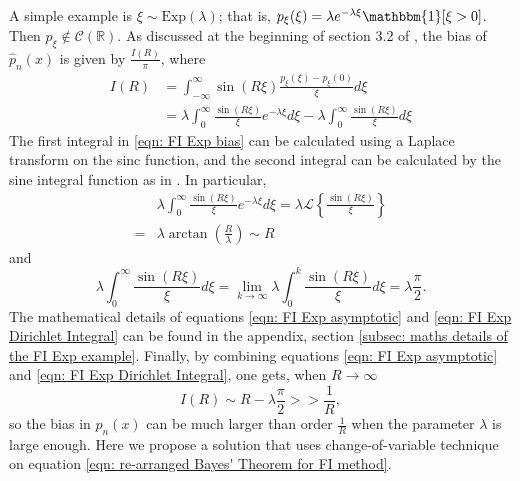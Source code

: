 \documentclass[%
 reprint,
 amsmath,amssymb,
 aps,
]{revtex4-2}
\def\R{\mathbb{R}}
\begin{document}
A simple example is $\xi \sim \text{Exp}(\lambda)$; that is, $p_\xi(\xi) = \lambda e^{-\lambda \xi} \mathbbm{1}[\xi > 0]$. Then $p_\xi \notin \mathcal{C}(\R)$. As discussed at the beginning of section 3.2 of \cite{rotiroti2022computing}, the bias of $\hat{p}_n(x)$ is given by $\displaystyle \frac{I(R)}{\pi}$, where
\begin{align} \label{eqn: FI Exp bias}
    I(R) & = \int_{-\infty}^\infty \sin(R\xi) \frac{p_\xi(\xi) - p_\xi(0)}{\xi} d\xi \\
    & = \lambda \int_0^\infty \frac{\sin(R\xi)}{\xi} e^{-\lambda \xi} d\xi - \lambda \int_0^\infty \frac{\sin(R\xi)}{\xi} d\xi
\end{align}
The first integral in \eqref{eqn: FI Exp bias} can be calculated using a Laplace transform on the sinc function, and the second integral can be calculated by the sine integral function as in \cite{rotiroti2022computing}. In particular,
\begin{align} \label{eqn: FI Exp asymptotic}
    & \lambda \int_0^\infty \frac{\sin(R\xi)}{\xi} e^{-\lambda \xi} d\xi = \lambda \mathcal{L}\left\{\frac{\sin(R\xi)}{\xi} \right\} \\
    = & \lambda \arctan\left(\frac{R}{\lambda}\right) \sim R
\end{align}
and
\begin{equation} \label{eqn: FI Exp Dirichlet Integral}
    \lambda \int_0^\infty \frac{\sin(R\xi)}{\xi} d\xi = \lim_{k \to \infty} \lambda \int_0^k \frac{\sin(R\xi)}{\xi} d\xi = \lambda\frac{\pi}{2}.
\end{equation}
The mathematical details of equations \eqref{eqn: FI Exp asymptotic} and \eqref{eqn: FI Exp Dirichlet Integral} can be found in the appendix, section \ref{subsec: maths details of the FI Exp example}. Finally, by combining equations \eqref{eqn: FI Exp asymptotic} and \eqref{eqn: FI Exp Dirichlet Integral}, one gets, when $R \to \infty$
\begin{equation} \label{eqn: FI Exp bias I component}
    I(R) \sim R - \lambda \frac{\pi}{2} >> \frac{1}{R},
\end{equation}
so the bias in $\hat{p}_n(x)$ can be much larger than order $\frac{1}{R}$ when the parameter $\lambda$ is large enough. Here we propose a solution that uses change-of-variable technique on equation \eqref{eqn: re-arranged Bayes' Theorem for FI method}.
\end{document}
